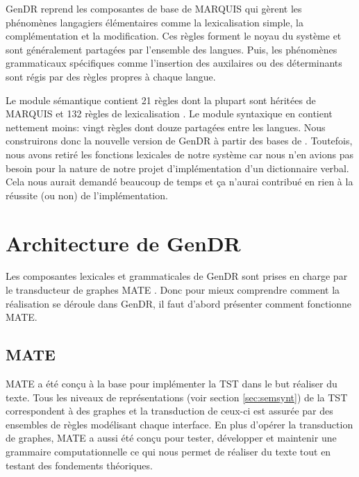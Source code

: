 GenDR reprend les composantes de base de MARQUIS qui gèrent les phénomènes langagiers élémentaires comme la  lexicalisation simple, la complémentation et la modification. Ces règles forment le noyau du système et sont généralement partagées par l'ensemble des langues. Puis, les phénomènes grammaticaux spécifiques comme l'insertion des auxilaires ou des déterminants sont régis par des règles propres à chaque langue.

Le module sémantique contient 21 règles dont la plupart sont héritées de MARQUIS et 132 règles de lexicalisation \citep{LambreyImplementationcollocationspour2017}. Le module syntaxique en contient nettement moins: vingt règles dont douze partagées entre les langues. Nous construirons donc la nouvelle version de GenDR à partir des bases de \cite{LambreyImplementationcollocationspour2017, lareau18,dubinskaite17}. Toutefois, nous avons retiré les fonctions lexicales de notre système car nous n'en avions pas besoin pour la nature de notre projet d'implémentation d'un dictionnaire verbal. Cela nous aurait demandé beaucoup de temps et ça n'aurai contribué en rien à la réussite (ou non) de l'implémentation.

\section{Architecture de GenDR}

Les composantes lexicales et grammaticales de GenDR sont prises en charge par le transducteur de graphes MATE \citep{BohnetDevelopmentEnvironmentMTTbased2000a,BOHNET10,bohnet07}. Donc pour mieux comprendre comment la réalisation se déroule dans GenDR, il faut d'abord présenter comment fonctionne MATE.

\subsection{MATE}
MATE a été conçu à la base pour implémenter la \ac{TST} dans le but réaliser du texte. Tous les niveaux de représentations (voir section \ref{sec:semsynt}) de la \ac{TST} correspondent à des graphes et la transduction de ceux-ci est assurée par des ensembles de règles modélisant chaque interface. En plus d'opérer la transduction de graphes, MATE a aussi été conçu pour tester, développer et maintenir une grammaire computationnelle ce qui nous permet de réaliser du texte tout en testant des fondements théoriques.

